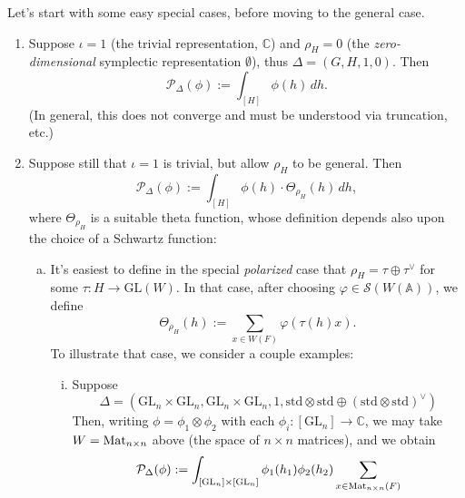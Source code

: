 \documentclass[reqno]{amsart} 
\begin{document}
Let's start with some easy special cases, before moving to the general case.
\begin{enumerate}
\item\label{enumerate:cq6tg85st6} Suppose $\iota = 1$ (the trivial representation, $\mathbb{C}$) and $\rho_H = 0$ (the \emph{zero-dimensional} symplectic representation $\emptyset$), thus $\Delta =(G, H, 1, 0)$.  Then
  \begin{equation*}
    \mathcal{P}_\Delta(\phi) := \int_{[H]} \phi(h) \, d h.
  \end{equation*}
  (In general, this does not converge and must be understood via truncation, etc.)
\item\label{enumerate:cq6tg85t0e} Suppose still that $\iota = 1$ is trivial, but allow $\rho_H$ to be general.  Then
  \begin{equation*}
    \mathcal{P}_\Delta(\phi) := \int_{[H]} \phi(h) \cdot \Theta_{\rho_H}(h) \, d h,
  \end{equation*}
  where $\Theta_{\rho_H}$ is a suitable theta function, whose definition depends also upon the choice of a Schwartz function:
  \begin{enumerate}[(a)]
  \item\label{enumerate:cq6thb0l6i} It's easiest to define in the special \emph{polarized} case that $\rho_H = \tau \oplus \tau^\vee$ for some $\tau : H \rightarrow\mathrm{GL}(W)$.  In that case, after choosing $\varphi \in \mathcal{S}(W(\mathbb{A}))$, we define
    \begin{equation*}
      \Theta_{\rho_H}(h) := \sum_{x \in W(F)} \varphi(\tau(h) x).
    \end{equation*}
    To illustrate that case, we consider a couple examples:
    \begin{enumerate}[(i)]
    \item\label{enumerate:cq6thb0n66} Suppose
      \begin{equation*}
        \Delta =(\mathrm{GL}_n \times \mathrm{GL}_n, \mathrm{GL}_n \times \mathrm{GL}_n, 1, \mathrm{std} \otimes \mathrm{std \oplus(\mathrm{std} \otimes \mathrm{std})^\vee})
      \end{equation*}
      Then, writing $\phi = \phi_1 \otimes \phi_2$ with each $\phi_i :[\mathrm{GL}_n] \rightarrow \mathbb{C}$, we may take $W = \operatorname{Mat}_{n \times n}$ above (the space of $n \times n$ matrices), and we obtain
      \begin{equation*}
        \mathcal{P}_\Delta(\phi) := \int_{[\mathrm{GL}_n] \times[\mathrm{GL}_n]} \phi_1(h_1) \phi_2(h_2) \sum_{x \in \Mat_{n \times n}(F)}

\end{equation*}
\end{enumerate}
\end{enumerate}
\end{enumerate}
\end{document}
